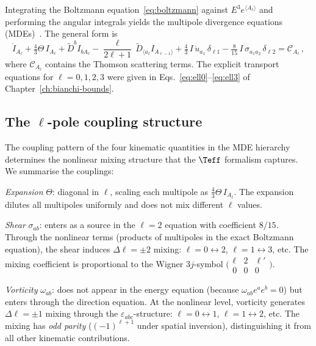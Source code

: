 Integrating the Boltzmann equation~\eqref{eq:boltzmann} against
$E^3 e^{\langle A_\ell\rangle}$ and performing the angular
integrals yields the multipole divergence equations
(MDEs)~\cite{MaartensGE1999,ChallinorLasenby1999}.  The general
form is
\begin{equation}\label{eq:MDE-general-teff}
\dot{I}_{A_\ell}
+ \tfrac{4}{3}\Theta\,I_{A_\ell}
+ \tilde{D}^b I_{bA_\ell}
- \frac{\ell}{2\ell+1}\,\tilde{D}_{\langle a_\ell}
  I_{A_{\ell-1}\rangle}
+ \tfrac{4}{3}\,I\,\dot{u}_{a_1}\,\delta_{\ell 1}
- \tfrac{8}{15}\,I\,\sigma_{a_1 a_2}\,\delta_{\ell 2}
= \mathcal{C}_{A_\ell}\,,
\end{equation}
where $\mathcal{C}_{A_\ell}$ contains the Thomson scattering
terms.  The explicit transport equations for
$\ell = 0, 1, 2, 3$ were given in
Eqs.~\eqref{eq:ell0}--\eqref{eq:ell3} of
Chapter~\ref{ch:bianchi-bounds}.


\subsection{The $\ell$-pole coupling structure}
\label{sec:ell-coupling}

The coupling pattern of the four kinematic quantities in the
MDE hierarchy determines the nonlinear mixing structure that
the $\Teff$ formalism captures.  We summarise the couplings:

\emph{Expansion} $\Theta$: diagonal in $\ell$, scaling each
multipole as $\frac{4}{3}\Theta\,I_{A_\ell}$.  The expansion
dilutes all multipoles uniformly and does not mix different
$\ell$ values.

\emph{Shear} $\sigma_{ab}$: enters as a source in the
$\ell = 2$ equation with coefficient $8/15$.  Through the
nonlinear terms (products of multipoles in the exact Boltzmann
equation), the shear induces $\Delta\ell = \pm 2$ mixing:
$\ell = 0 \leftrightarrow 2$,
$\ell = 1 \leftrightarrow 3$, etc.  The mixing coefficient is
proportional to the Wigner $3j$-symbol
$\bigl(\begin{smallmatrix} \ell & 2 & \ell' \\
0 & 0 & 0 \end{smallmatrix}\bigr)$.

\emph{Vorticity} $\omega_{ab}$: does not appear in the energy
equation (because $\omega_{ab}e^a e^b = 0$) but enters through
the direction equation.  At the nonlinear level, vorticity
generates $\Delta\ell = \pm 1$ mixing through the
$\varepsilon_{abc}$-structure:
$\ell = 0 \leftrightarrow 1$,
$\ell = 1 \leftrightarrow 2$, etc.  The mixing has
\emph{odd parity} ($(-1)^{\ell+1}$ under spatial inversion),
distinguishing it from all other kinematic contributions.

